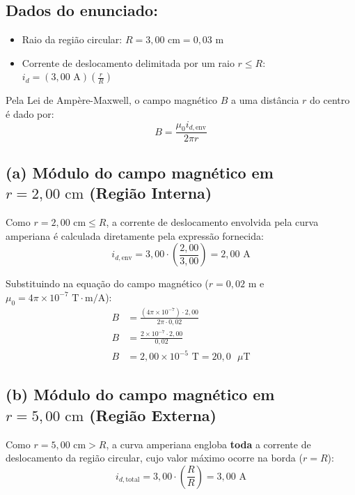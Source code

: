 \documentclass[12pt,a4paper]{article}
\begin{document}
\subsection*{Dados do enunciado:}
\begin{itemize}
    \item Raio da região circular: $R = 3,00\text{ cm} = 0,03\text{ m}$
    \item Corrente de deslocamento delimitada por um raio $r \le R$: $i_d = (3,00\text{ A})\left(\frac{r}{R}\right)$
\end{itemize}

Pela Lei de Ampère-Maxwell, o campo magnético $B$ a uma distância $r$ do centro é dado por:
\begin{equation*}
B = \frac{\mu_0 i_{d,\text{env}}}{2\pi r}
\end{equation*}

\subsection*{(a) Módulo do campo magnético em $r = 2,00\text{ cm}$ (Região Interna)}

Como $r = 2,00\text{ cm} \le R$, a corrente de deslocamento envolvida pela curva amperiana é calculada diretamente pela expressão fornecida:
\begin{equation*}
i_{d,\text{env}} = 3,00 \cdot \left(\frac{2,00}{3,00}\right) = 2,00\text{ A}
\end{equation*}

Substituindo na equação do campo magnético ($r = 0,02\text{ m}$ e $\mu_0 = 4\pi \times 10^{-7}\text{ T}\cdot\text{m/A}$):
\begin{align*}
B &= \frac{(4\pi \times 10^{-7}) \cdot 2,00}{2\pi \cdot 0,02} \\
B &= \frac{2 \times 10^{-7} \cdot 2,00}{0,02} \\
B &= 2,00 \times 10^{-5}\text{ T} = 20,0\text{ }\mu\text{T}
\end{align*}

\subsection*{(b) Módulo do campo magnético em $r = 5,00\text{ cm}$ (Região Externa)}

Como $r = 5,00\text{ cm} > R$, a curva amperiana engloba \textbf{toda} a corrente de deslocamento da região circular, cujo valor máximo ocorre na borda ($r = R$):
\begin{equation*}
i_{d,\text{total}} = 3,00 \cdot \left(\frac{R}{R}\right) = 3,00\text{ A}
\end{equation*}
\end{document}
